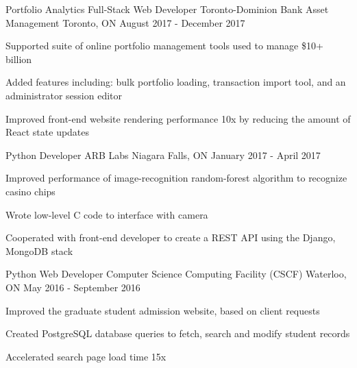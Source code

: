 

\addvspace{1ex}

\begin{cventries}

\cventry
{Portfolio Analytics Full-Stack Web Developer} %
{Toronto-Dominion Bank Asset Management} %
{Toronto, ON} %
{August 2017 - December 2017} %
{ %
\begin{cvitems}
\item {Supported suite of online portfolio management tools used to manage \$10+ billion}
\item {Added features including: bulk portfolio loading, transaction import tool, and an administrator session editor}
\item {Improved front-end website rendering performance 10x by reducing the amount of React state updates}
\end{cvitems}
}


\cventry
{Python Developer} %
{ARB Labs} %
{Niagara Falls, ON} %
{January 2017 - April 2017} %
{ %
\begin{cvitems}
\item {Improved performance of image-recognition random-forest algorithm to recognize casino chips}
\item {Wrote low-level C code to interface with camera}
\item {Cooperated with front-end developer to create a REST API using the Django, MongoDB stack}
\end{cvitems}
}


\cventry
{Python Web Developer} %
{Computer Science Computing Facility (CSCF)} %
{Waterloo, ON} %
{May 2016 - September 2016} %
{ %
\begin{cvitems}
\item {Improved the graduate student admission website, based on client requests}
\item {Created PostgreSQL database queries to fetch, search and modify student records}
\item {Accelerated search page load time 15x}
\end{cvitems}
}


\end{cventries}
